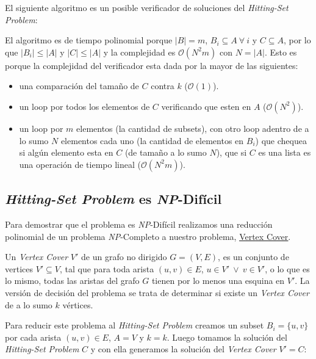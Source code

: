 El siguiente algoritmo es un posible verificador de soluciones del
\textit{Hitting-Set Problem}:



El algoritmo es de tiempo polinomial porque $|B| = m$, $B_i \subseteq A \
\forall \ i$ y $C \subseteq A$, por lo que $|B_i| \le |A|$ y $|C| \le |A|$ y la
complejidad es $\mathcal{O}(N^2m)$ con $N = |A|$. Esto es porque la complejidad
del verificador esta dada por la mayor de las siguientes:

\begin{itemize}
    \item una comparación del tamaño de $C$ contra $k$ ($\mathcal{O}(1)$).

    \item un loop por todos los elementos de $C$ verificando que esten en $A$
    ($\mathcal{O}(N^2)$).

    \item un loop por $m$ elementos (la cantidad de subsets), con otro loop
    adentro de a lo sumo $N$ elementos cada uno (la cantidad de elementos en
    $B_i$) que chequea si algún elemento esta en $C$ (de tamaño a lo sumo $N$),
    que si $C$ es una lista es una operación de tiempo lineal
    ($\mathcal{O}(N^2m)$).
\end{itemize}

\subsection{\textit{Hitting-Set Problem} es \textit{NP}-Difícil}

Para demostrar que el problema es \textit{NP}-Difícil realizamos una reducción
polinomial de un problema \textit{NP}-Completo a nuestro problema,
\href{https://en.wikipedia.org/wiki/Vertex_cover}{\underline{Vertex Cover}}.

Un \textit{Vertex Cover} $V'$ de un grafo no dirigido $G = (V, E)$, es un
conjunto de vertices $V' \subseteq V$, tal que para toda arista $(u, v) \in E$,
$u \in V'\ \lor\ v \in V'$, o lo que es lo mismo, todas las aristas del grafo
$G$ tienen por lo menos una esquina en $V'$. La versión de decisión del
problema se trata de determinar si existe un \textit{Vertex Cover} de a lo sumo
$k$ vértices.

Para reducir este problema al \textit{Hitting-Set Problem} creamos un subset
$B_i = \{ u, v \}$ por cada arista $(u, v) \in E$, $A = V$ y $k = k$. Luego
tomamos la solución del \textit{Hitting-Set Problem} $C$ y con ella generamos
la solución del \textit{Vertex Cover} $V' = C$:

